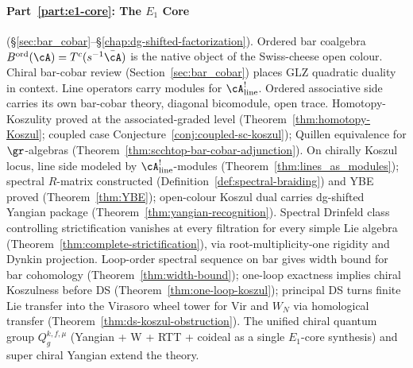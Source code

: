 \paragraph{Part~\ref{part:e1-core}: The $E_1$ Core}
(\S\ref{sec:bar_cobar}--\S\ref{chap:dg-shifted-factorization}).
Ordered bar coalgebra $B^{\mathrm{ord}}(\cA) = T^c(s^{-1}\bar\cA)$
is the native object of the Swiss-cheese open colour. Chiral
bar-cobar review (Section~\ref{sec:bar_cobar}) places GLZ
quadratic duality in context. Line operators carry modules for
$\cA^!_{\mathrm{line}}$. Ordered associative side carries its
own bar-cobar theory, diagonal bicomodule, open trace.
Homotopy-Koszulity proved at the associated-graded level
(Theorem~\ref{thm:homotopy-Koszul}; coupled case
Conjecture~\ref{conj:coupled-sc-koszul}); Quillen equivalence for
$\gr$-algebras
(Theorem~\ref{thm:scchtop-bar-cobar-adjunction}). On chirally Koszul
locus, line side modeled by $\cA^!_{\mathrm{line}}$-modules
(Theorem~\ref{thm:lines_as_modules}); spectral $R$-matrix
constructed (Definition~\ref{def:spectral-braiding}) and YBE
proved (Theorem~\ref{thm:YBE}); open-colour Koszul dual carries
dg-shifted Yangian package
(Theorem~\ref{thm:yangian-recognition}).
Spectral Drinfeld class controlling strictification vanishes at
every filtration for every simple Lie algebra
(Theorem~\ref{thm:complete-strictification}), via
root-multiplicity-one rigidity and Dynkin projection. Loop-order
spectral sequence on bar gives width bound for bar cohomology
(Theorem~\ref{thm:width-bound}); one-loop exactness implies
chiral Koszulness before DS (Theorem~\ref{thm:one-loop-koszul});
principal DS turns finite Lie transfer into the Virasoro wheel tower for
Vir and $W_N$ via homological transfer
(Theorem~\ref{thm:ds-koszul-obstruction}). The unified chiral
quantum group $Q_g^{k,f,\mu}$ (Yangian + W + RTT + coideal as a
single $E_1$-core synthesis) and super chiral Yangian extend the
theory.

